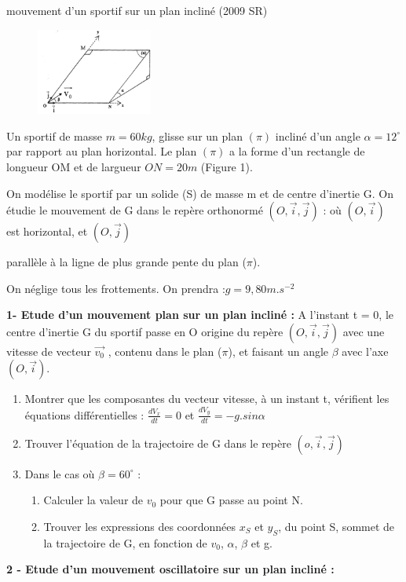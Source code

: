 \documentclass[12pt]{article}
\begin{document}
\begin{Box2}{mouvement d’un sportif sur un plan incliné (2009 SR) }

	\begin{figure}
		\begin{center}
			\vspace{-0.6cm}
			\includegraphics[width=0.34\textwidth]{./img/incl00.png}
      
		\end{center}
	\end{figure}
  Un sportif de masse $m = 60 kg$, glisse sur un plan $(\pi)$ incliné d’un angle $\alpha = 12^{\circ}$
par rapport au plan horizontal.
Le plan $(\pi)$ a la forme d’un rectangle de longueur OM et de largueur $ON = 20 m$
(Figure 1).

On modélise le sportif par un solide (S) de masse m et de centre d’inertie G.
On étudie le mouvement de G dans le repère orthonormé
$(O, \vec{i}, \vec{j})$ : où $(O,\vec{i})$ est  horizontal, et
  $(O, \vec{j})$

  parallèle à la ligne de plus grande pente du plan ($\pi$).

On néglige tous les frottements.
  On prendra :$ g = 9,80 m.s^{-2}$

  \textbf{1- Etude d’un mouvement plan sur un plan incliné :}
  A l’instant t = 0, le centre d’inertie G du sportif passe en O origine du repère
$(O, \vec{i}, \vec{j})$ avec une vitesse de vecteur $\vec{v_0}$ , contenu dans le plan ($\pi$), et faisant un angle $\beta$ avec l’axe $(O,\vec{i})$.

\begin{enumerate}
  \item Montrer que les composantes du vecteur vitesse, à un instant t, vérifient les
    équations différentielles : $\frac{dV_x}{dt} = 0$ et $\frac{dV_y}{dt} = -g.sin\alpha$
  \item Trouver l’équation de la trajectoire de G dans le repère $(o, \vec{i}, \vec{j})$
  \item Dans le cas où $\beta = 60^{\circ}$ :

    \begin{enumerate}
      \item Calculer la valeur de $v_0$ pour que G passe au point N.
      \item Trouver les expressions des coordonnées $x_S$ et $y_S$, du point S, sommet
de la trajectoire de G, en fonction de $v_0$, $\alpha$, $\beta$ et g.
    \end{enumerate}
\end{enumerate}
  \textbf{2 - Etude d’un mouvement oscillatoire sur un plan incliné :}


\end{Box2}
\end{document}
